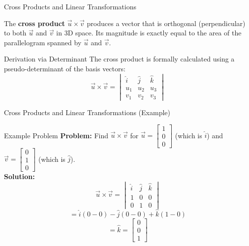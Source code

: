 \documentclass[10pt, aspectratio=169]{beamer}
\begin{document}
\begin{frame}{Cross Products and Linear Transformations}
    \begin{definition}
        The \textbf{cross product} $\vec{u} \times \vec{v}$ produces a vector that is orthogonal (perpendicular) to both $\vec{u}$ and $\vec{v}$ in 3D space. Its magnitude is exactly equal to the area of the parallelogram spanned by $\vec{u}$ and $\vec{v}$.
    \end{definition}

    \begin{block}{Derivation via Determinant}
        The cross product is formally calculated using a pseudo-determinant of the basis vectors:
        $$\vec{u} \times \vec{v} = \begin{vmatrix} \hat{i} & \hat{j} & \hat{k} \\ u_1 & u_2 & u_3 \\ v_1 & v_2 & v_3 \end{vmatrix}$$
    \end{block}
\end{frame}

\begin{frame}{Cross Products and Linear Transformations (Example)}
    \begin{exampleblock}{Example Problem}
        \textbf{Problem:} Find $\vec{u} \times \vec{v}$ for $\vec{u} = \begin{bmatrix} 1 \\ 0 \\ 0 \end{bmatrix}$ (which is $\hat{i}$) and $\vec{v} = \begin{bmatrix} 0 \\ 1 \\ 0 \end{bmatrix}$ (which is $\hat{j}$). \\
        \vspace{0.5cm}
        \textbf{Solution:}
        $$\vec{u} \times \vec{v} = \begin{vmatrix} \hat{i} & \hat{j} & \hat{k} \\ 1 & 0 & 0 \\ 0 & 1 & 0 \end{vmatrix}$$
        $$= \hat{i}(0-0) - \hat{j}(0-0) + \hat{k}(1-0)$$
        $$= \hat{k} = \begin{bmatrix} 0 \\ 0 \\ 1 \end{bmatrix}$$
    \end{exampleblock}
\end{frame}
\end{document}
